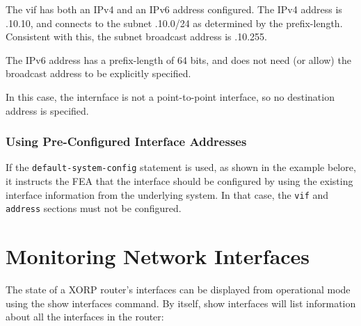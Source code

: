 The vif has both an IPv4 and an IPv6 address configured.  The IPv4
address is {.10.10}, and connects to the subnet {.10.0/24} as determined by the prefix-length.  Consistent with
this, the subnet broadcast address is {.10.255}.

The IPv6 address has a prefix-length of 64 bits, and does not need (or
allow) the broadcast address to be explicitly specified.  

In this case, the internface is not a point-to-point interface, so no
destination address is specified.


\subsubsection{Using Pre-Configured Interface Addresses}

If the {\tt default-system-config} statement is used, as shown in the
example belore, it instructs the FEA that the interface should be
configured by using the existing interface information from the
underlying system.  In that case, the {\tt vif} and {\tt address}
sections must not be configured.

\vspace{0.1in}
\noindent{}
\vspace{0.1in}


\newpage
\section{Monitoring Network Interfaces}

The state of a XORP router's interfaces can be displayed from
operational mode using the {\stt show interfaces} command.  By itself,
{\stt show interfaces} will list information about all the interfaces
in the router:

